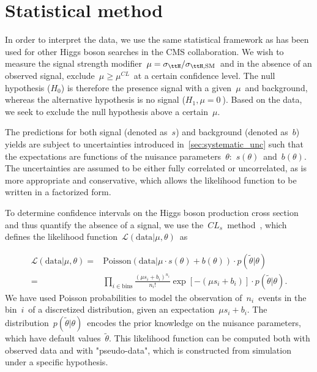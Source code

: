 \section{Statistical method}
\label{sec:statistical_method}
In order to interpret the data, we use the same statistical framework as has been used for other Higgs boson searches in the CMS collaboration\cite{Chatrchyan:2012xdj,Chatrchyan:2012tx,ATLAS:2011tau}. We wish to measure the signal strength modifier~$\mu = \sigma_{\ttH}/\sigma_{\ttH,\mathrm{SM}}$~and in the absence of an observed signal, exclude~$\mu \ge \mu^{CL}$~at a certain confidence level. The null hypothesis ($H_0$) is therefore the presence signal with a given~$\mu$~and background, whereas the alternative hypothesis is no signal ($H_1, \mu = 0~$). Based on the data, we seek to exclude the null hypothesis above a certain~$\mu$.

The predictions for both signal (denoted as~$s$) and background (denoted as~$b$) yields are subject to uncertainties introduced in~\cref{sec:systematic_unc} such that the expectations are functions of the nuisance parameters~$\theta$:~$s(\theta)$~and~$b(\theta)$. The uncertainties are assumed to be either fully correlated or uncorrelated, as is more appropriate and conservative, which allows the likelihood function to be written in a factorized form.

To determine confidence intervals on the Higgs boson production cross section and thus quantify the absence of a signal, we use the~$CL_s$~method~\cite{Junk:1999kv,Read:2002}, which defines the likelihood function~$\mathcal{L}(\mathrm{data} | \mu, \theta)$~as

\begin{align}
\label{eq:likelihood}
\mathcal{L}(\mathrm{data} | \mu, \theta) =&  \mathrm{Poisson}(\mathrm{data} | \mu \cdot s(\theta) + b(\theta)) \cdot p(\tilde{\theta} | \theta)\\
=& \prod_{i\in \mathrm{bins}} \frac{(\mu s_i + b_i)^{n_i}}{n_i!} \exp{[-(\mu s_i + b_i)]} \cdot p(\tilde{\theta} | \theta).
\end{align}
We have used Poisson probabilities to model the observation of~$n_i$~events in the bin~$i$~of a discretized distribution, given an expectation~$\mu s_i + b_i$. The distribution~$p(\tilde{\theta} | \theta)$~encodes the prior knowledge on the nuisance parameters, which have default values~$\tilde{\theta}$. This likelihood function can be computed both with observed data and with "pseudo-data", which is constructed from simulation under a specific hypothesis.

